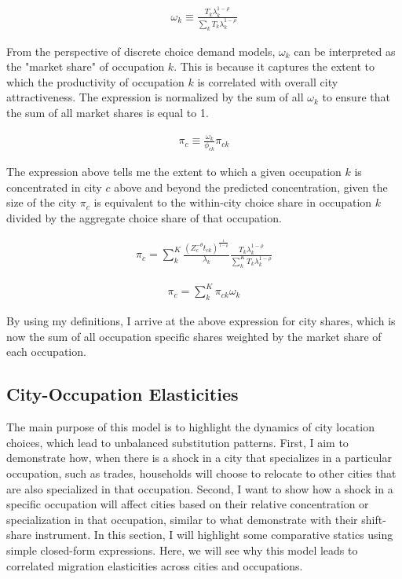\documentclass[10pt]{article}
\begin{document}
\begin{align}
    \omega_k \equiv \frac{{T_{k}}\lambda_{k}^{1-\rho}}{\sum\limits_{k}{T_{k}}\lambda_{k}^{1-\rho}}
    \label{occupation_shares}
\end{align}

From the perspective of discrete choice demand models, $\omega_k$ can be interpreted as the "market share" of occupation $k$. This is because it captures the extent to which the productivity of occupation $k$ is correlated with overall city attractiveness. The expression is normalized by the sum of all $\omega_k$ to ensure that the sum of all market shares is equal to 1.

\begin{align}
    \pi_c \equiv \frac{\omega_k}{\phi_{ck}} \pi_{ck}
    \label{identity}
\end{align}

The expression above tells me the extent to which a given occupation $k$ is concentrated in city $c$ above and beyond the predicted concentration, given the size of the city $\pi_c$ is equivalent to the within-city choice share in occupation $k$ divided by the aggregate choice share of that occupation.

\begin{align*}
    \pi_{c} = \sum_{k}^{K} \frac{(Z_{c}^{-\theta} t_{ck})^{\frac{1}{1-\rho}}}{\lambda_k} \frac{T_k \lambda_{k}^{1 - \rho}}{\sum \limits_{k}^{K} T_k \lambda_{k}^{1-\rho}}
\end{align*}

\begin{align}
    \pi_c = \sum_{k}^{K} \pi_{ck} \omega_k
\end{align}

By using my definitions, I arrive at the above expression for city shares, which is now the sum of all occupation specific shares weighted by the market share of each occupation.

\subsection{City-Occupation Elasticities}

The main purpose of this model is to highlight the dynamics of city location choices, which lead to unbalanced substitution patterns. First, I aim to demonstrate how, when there is a shock in a city that specializes in a particular occupation, such as trades, households will choose to relocate to other cities that are also specialized in that occupation. Second, I want to show how a shock in a specific occupation will affect cities based on their relative concentration or specialization in that occupation, similar to what \cite{adh2013} demonstrate with their shift-share instrument. In this section, I will highlight some comparative statics using simple closed-form expressions. Here, we will see why this model leads to correlated migration elasticities across cities and occupations.
\end{document}
